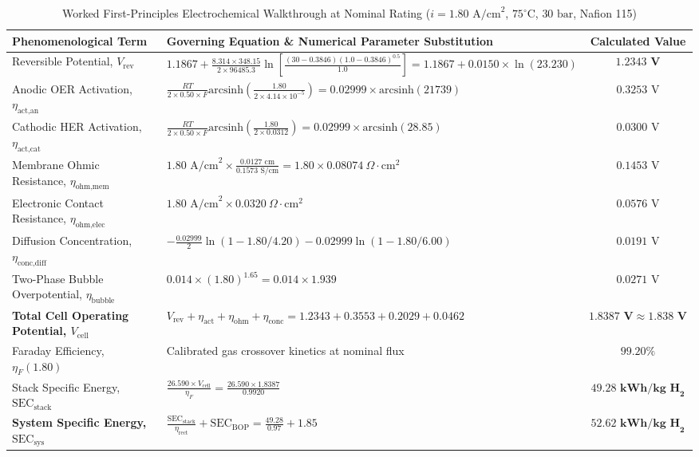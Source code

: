 \documentclass[conference]{IEEEtran}
\begin{document}
\begin{table}[!t]
\caption{Worked First-Principles Electrochemical Walkthrough at Nominal Rating ($i = 1.80\text{ A/cm}^2$, $75^\circ\text{C}$, $30\text{ bar}$, Nafion 115)}
\begin{center}
\begin{tabular}{llc}
\toprule
\textbf{Phenomenological Term} & \textbf{Governing Equation \& Numerical Parameter Substitution} & \textbf{Calculated Value} \\
\midrule
Reversible Potential, $V_{\text{rev}}$ & $1.1867 + \frac{8.314 \times 348.15}{2 \times 96485.3}\ln\left[\frac{(30 - 0.3846)(1.0 - 0.3846)^{0.5}}{1.0}\right] = 1.1867 + 0.0150 \times \ln(23.230)$ & $\mathbf{1.2343\text{ V}}$ \\
Anodic OER Activation, $\eta_{\text{act,an}}$ & $\frac{RT}{2 \times 0.50 \times F}\text{arcsinh}\left(\frac{1.80}{2 \times 4.14 \times 10^{-5}}\right) = 0.02999 \times \text{arcsinh}(21739)$ & $0.3253\text{ V}$ \\
Cathodic HER Activation, $\eta_{\text{act,cat}}$ & $\frac{RT}{2 \times 0.50 \times F}\text{arcsinh}\left(\frac{1.80}{2 \times 0.0312}\right) = 0.02999 \times \text{arcsinh}(28.85)$ & $0.0300\text{ V}$ \\
Membrane Ohmic Resistance, $\eta_{\text{ohm,mem}}$ & $1.80\text{ A/cm}^2 \times \frac{0.0127\text{ cm}}{0.1573\text{ S/cm}} = 1.80 \times 0.08074\ \Omega\cdot\text{cm}^2$ & $0.1453\text{ V}$ \\
Electronic Contact Resistance, $\eta_{\text{ohm,elec}}$ & $1.80\text{ A/cm}^2 \times 0.0320\ \Omega\cdot\text{cm}^2$ & $0.0576\text{ V}$ \\
Diffusion Concentration, $\eta_{\text{conc,diff}}$ & $-\frac{0.02999}{2}\ln(1 - 1.80/4.20) - 0.02999\ln(1 - 1.80/6.00)$ & $0.0191\text{ V}$ \\
Two-Phase Bubble Overpotential, $\eta_{\text{bubble}}$ & $0.014 \times (1.80)^{1.65} = 0.014 \times 1.939$ & $0.0271\text{ V}$ \\
\midrule
\textbf{Total Cell Operating Potential, $V_{\text{cell}}$} & $V_{\text{rev}} + \eta_{\text{act}} + \eta_{\text{ohm}} + \eta_{\text{conc}} = 1.2343 + 0.3553 + 0.2029 + 0.0462$ & $\mathbf{1.8387\text{ V} \approx 1.838\text{ V}}$ \\
Faraday Efficiency, $\eta_F(1.80)$ & Calibrated gas crossover kinetics at nominal flux & $\mathbf{99.20\%}$ \\
Stack Specific Energy, $\text{SEC}_{\text{stack}}$ & $\frac{26.590 \times V_{\text{cell}}}{\eta_F} = \frac{26.590 \times 1.8387}{0.9920}$ & $\mathbf{49.28\text{ kWh/kg H}_2}$ \\
\textbf{System Specific Energy, $\text{SEC}_{\text{sys}}$} & $\frac{\text{SEC}_{\text{stack}}}{\eta_{\text{rect}}} + \text{SEC}_{\text{BOP}} = \frac{49.28}{0.97} + 1.85$ & $\mathbf{52.62\text{ kWh/kg H}_2}$ \\
\bottomrule
\end{tabular}
\label{tab:pem_worked}
\end{center}
\end{table}
\end{document}
